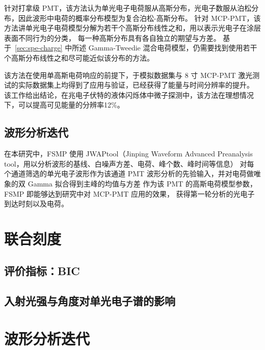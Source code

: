针对打拿级 PMT，该方法认为单光电子电荷服从高斯分布，光电子数服从泊松分布，因此波形中电荷的概率分布模型为复合泊松-高斯分布。
针对 MCP-PMT，该方法讲单光电子电荷模型分解为若干个高斯分布线性之和，用以表示光电子在涂层表面不同行为的分类，
每一种高斯分布具有各自独立的期望与方差。
基于~\ref{sec:spe-charge} 中所述 Gamma-Tweedie 混合电荷模型，仍需要找到使用若干个高斯分布线性之和尽可能近似该分布的方法。

该方法在使用单高斯电荷响应的前提下，于模拟数据集与 8 寸 MCP-PMT 激光测试的实际数据集上均得到了应用与验证，已经获得了能量与时间分辨率的提升。
该工作给出结论，在兆电子伏特的液体闪烁体中微子探测中，该方法在理想情况下，可以提高可见能量的分辨率12\%。

\subsection{波形分析迭代}
在本研究中，FSMP 使用 JWAPtool（Jinping Waveform Advanced Preanalysis tool，用以分析波形的基线、白噪声方差、电荷、峰个数、峰时间等信息）
对每个通道筛选的单光电子波形作为该通道 PMT 波形分析的先验输入，并对电荷做唯象的双 Gamma 拟合得到主峰的均值与方差
作为该 PMT 的高斯电荷模型参数，FSMP 即能够达到研究\cite{wangFastStochasticMatching2024a}中对 MCP-PMT 应用的效果，
获得第一轮分析的光电子到达时刻以及电荷。



\section{联合刻度}

\subsection{评价指标：BIC}

\subsection{入射光强与角度对单光电子谱的影响}

\section{波形分析迭代}

\subsection{}
